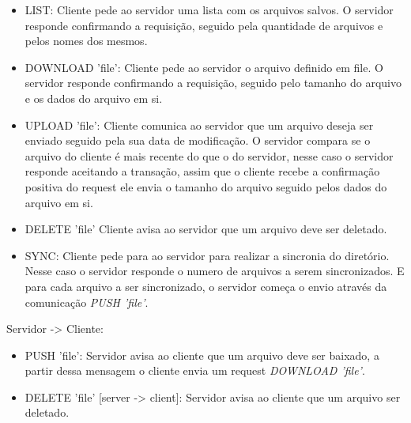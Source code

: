 \documentclass[a4paper]{article}
\begin{document}
\begin{itemize}
\item LIST:
\newline Cliente pede ao servidor uma lista com os arquivos salvos. O servidor responde confirmando a requisição, seguido pela quantidade de arquivos e pelos nomes dos mesmos.

\item DOWNLOAD 'file':
\newline Cliente pede ao servidor o arquivo definido em file. O servidor responde confirmando a requisição, seguido pelo tamanho do arquivo e os dados do arquivo em si.

\item UPLOAD 'file':
\newline Cliente comunica ao servidor que um arquivo deseja ser enviado seguido pela sua data de modificação. O servidor compara se o arquivo do cliente é mais recente do que o do servidor, nesse caso o servidor responde aceitando a transação, assim que o cliente recebe a confirmação positiva do request ele envia o tamanho do arquivo seguido pelos dados do arquivo em si.

\item DELETE 'file'
\newline Cliente avisa ao servidor que um arquivo deve ser deletado.

\item SYNC:
\newline Cliente pede para ao servidor para realizar a sincronia do diretório. Nesse caso o servidor responde o numero de arquivos a serem sincronizados. E para cada arquivo a ser sincronizado, o servidor começa o envio através da comunicação \textit{PUSH 'file'}.
\end{itemize}

Servidor -> Cliente:

\begin{itemize}

\item PUSH 'file':
\newline Servidor avisa ao cliente que um arquivo deve ser baixado, a partir dessa mensagem o cliente envia um request \textit{DOWNLOAD 'file'}.

\item DELETE 'file' [server -> client]:
\newline Servidor avisa ao cliente que um arquivo ser deletado.

\end{itemize}
\end{document}
